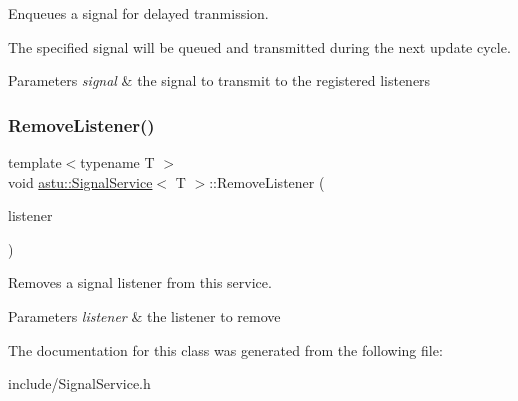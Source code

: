 Enqueues a signal for delayed tranmission.

The specified signal will be queued and transmitted during the next update cycle.


\begin{DoxyParams}{Parameters}
{\em signal} & the signal to transmit to the registered listeners \\
\hline
\end{DoxyParams}
\mbox{\label{classastu_1_1SignalService_aea0777f0393a7f3c4dafff9d58934194}} 
\subsubsection{\texorpdfstring{Remove\+Listener()}{RemoveListener()}}
{\footnotesize\ttfamily template$<$typename T $>$ \\
void \hyperlink{classastu_1_1SignalService}{astu\+::\+Signal\+Service}$<$ T $>$\+::Remove\+Listener (\begin{DoxyParamCaption}\item[{const std\+::shared\+\_\+ptr$<$ \hyperlink{classastu_1_1ISignalListener}{I\+Signal\+Listener}$<$ T $>$$>$ \&}]{listener }\end{DoxyParamCaption})\hspace{0.3cm}{\ttfamily [inline]}}

Removes a signal listener from this service.


\begin{DoxyParams}{Parameters}
{\em listener} & the listener to remove \\
\hline
\end{DoxyParams}


The documentation for this class was generated from the following file\+:\begin{DoxyCompactItemize}
\item 
include/Signal\+Service.\+h\end{DoxyCompactItemize}
